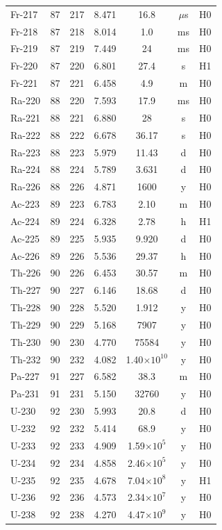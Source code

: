 \documentclass[11pt,a4paper]{article}
\begin{document}
\begin{small}
\begin{longtable}{lcccccc}
Fr-217 & 87 & 217 & 8.471 & 16.8 & $\mu$s & H0 \\
Fr-218 & 87 & 218 & 8.014 & 1.0 & ms & H0 \\
Fr-219 & 87 & 219 & 7.449 & 24 & ms & H0 \\
Fr-220 & 87 & 220 & 6.801 & 27.4 & s & H1 \\
Fr-221 & 87 & 221 & 6.458 & 4.9 & m & H0 \\
Ra-220 & 88 & 220 & 7.593 & 17.9 & ms & H0 \\
Ra-221 & 88 & 221 & 6.880 & 28 & s & H0 \\
Ra-222 & 88 & 222 & 6.678 & 36.17 & s & H0 \\
Ra-223 & 88 & 223 & 5.979 & 11.43 & d & H0 \\
Ra-224 & 88 & 224 & 5.789 & 3.631 & d & H0 \\
Ra-226 & 88 & 226 & 4.871 & 1600 & y & H0 \\
Ac-223 & 89 & 223 & 6.783 & 2.10 & m & H0 \\
Ac-224 & 89 & 224 & 6.328 & 2.78 & h & H1 \\
Ac-225 & 89 & 225 & 5.935 & 9.920 & d & H0 \\
Ac-226 & 89 & 226 & 5.536 & 29.37 & h & H0 \\
Th-226 & 90 & 226 & 6.453 & 30.57 & m & H0 \\
Th-227 & 90 & 227 & 6.146 & 18.68 & d & H0 \\
Th-228 & 90 & 228 & 5.520 & 1.912 & y & H0 \\
Th-229 & 90 & 229 & 5.168 & 7907 & y & H0 \\
Th-230 & 90 & 230 & 4.770 & 75584 & y & H0 \\
Th-232 & 90 & 232 & 4.082 & 1.40$\times 10^{10}$ & y & H0 \\
Pa-227 & 91 & 227 & 6.582 & 38.3 & m & H0 \\
Pa-231 & 91 & 231 & 5.150 & 32760 & y & H0 \\
U-230 & 92 & 230 & 5.993 & 20.8 & d & H0 \\
U-232 & 92 & 232 & 5.414 & 68.9 & y & H0 \\
U-233 & 92 & 233 & 4.909 & 1.59$\times 10^{5}$ & y & H0 \\
U-234 & 92 & 234 & 4.858 & 2.46$\times 10^{5}$ & y & H0 \\
U-235 & 92 & 235 & 4.678 & 7.04$\times 10^{8}$ & y & H1 \\
U-236 & 92 & 236 & 4.573 & 2.34$\times 10^{7}$ & y & H0 \\
U-238 & 92 & 238 & 4.270 & 4.47$\times 10^{9}$ & y & H0 \\

\end{longtable}
\end{small}
\end{document}
